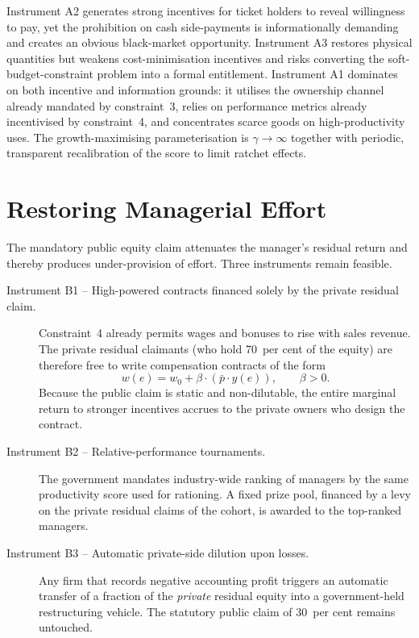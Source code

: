 \documentclass[12pt,anyside]{book}
\theoremstyle{definition}
\theoremstyle{plain}
\theoremstyle{remark}
\begin{document}
Instrument A2 generates strong incentives for ticket holders to reveal willingness to pay, yet the prohibition on cash side-payments is informationally demanding and creates an obvious black-market opportunity. Instrument A3 restores physical quantities but weakens cost-minimisation incentives and risks converting the soft-budget-constraint problem into a formal entitlement. Instrument A1 dominates on both incentive and information grounds: it utilises the ownership channel already mandated by constraint~3, relies on performance metrics already incentivised by constraint~4, and concentrates scarce goods on high-productivity uses. The growth-maximising parameterisation is $\gamma\to\infty$ together with periodic, transparent recalibration of the score to limit ratchet effects.

\section{Restoring Managerial Effort}

The mandatory public equity claim attenuates the manager’s residual return and thereby produces under-provision of effort. Three instruments remain feasible.

\begin{description}
\item[Instrument B1 -- High-powered contracts financed solely by the private residual claim.]  
Constraint~4 already permits wages and bonuses to rise with sales revenue. The private residual claimants (who hold 70~per cent of the equity) are therefore free to write compensation contracts of the form
\begin{equation}
w(e)=w_0+\beta\cdot(\bar{p}\cdot y(e)),\qquad\beta>0.
\end{equation}
Because the public claim is static and non-dilutable, the entire marginal return to stronger incentives accrues to the private owners who design the contract.

\item[Instrument B2 -- Relative-performance tournaments.]  
The government mandates industry-wide ranking of managers by the same productivity score used for rationing. A fixed prize pool, financed by a levy on the private residual claims of the cohort, is awarded to the top-ranked managers.

\item[Instrument B3 -- Automatic private-side dilution upon losses.]  
Any firm that records negative accounting profit triggers an automatic transfer of a fraction of the \emph{private} residual equity into a government-held restructuring vehicle. The statutory public claim of 30~per cent remains untouched.
\end{description}
\end{document}
